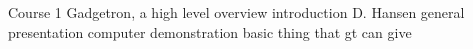 
    \begin{abstract_online}{Course 1 Gadgetron, a high level overview introduction}{%
        D. Hansen}{%
        }{%
        }
    general presentation  computer demonstration  basic thing that gt can give  
    
    \end{abstract_online}
    